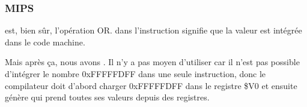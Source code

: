 ﻿\subsubsection{MIPS}




 est, bien sûr, l'opération OR.  dans l'instruction signifie que la
valeur est intégrée dans le code machine.


Mais après ça, nous avons \AND. Il n'y a pas moyen d'utiliser  car il n'est
pas possible d'intégrer le nombre 0xFFFFFDFF dans une seule instruction, donc le
compilateur doit d'abord charger 0xFFFFFDFF dans le registre \$V0 et ensuite génère
\AND qui prend toutes ses valeurs depuis des registres.
